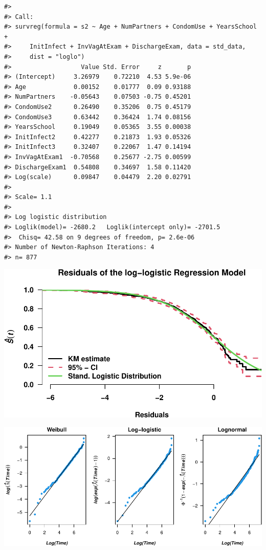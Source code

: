 \documentclass[
]{article}
\begin{document}
\begin{verbatim}
#> 
#> Call:
#> survreg(formula = s2 ~ Age + NumPartners + CondomUse + YearsSchool + 
#>     InitInfect + InvVagAtExam + DischargeExam, data = std_data, 
#>     dist = "loglo")
#>                   Value Std. Error     z       p
#> (Intercept)     3.26979    0.72210  4.53 5.9e-06
#> Age             0.00152    0.01777  0.09 0.93188
#> NumPartners    -0.05643    0.07503 -0.75 0.45201
#> CondomUse2      0.26490    0.35206  0.75 0.45179
#> CondomUse3      0.63442    0.36424  1.74 0.08156
#> YearsSchool     0.19049    0.05365  3.55 0.00038
#> InitInfect2     0.42277    0.21873  1.93 0.05326
#> InitInfect3     0.32407    0.22067  1.47 0.14194
#> InvVagAtExam1  -0.70568    0.25677 -2.75 0.00599
#> DischargeExam1  0.54808    0.34697  1.58 0.11420
#> Log(scale)      0.09847    0.04479  2.20 0.02791
#> 
#> Scale= 1.1 
#> 
#> Log logistic distribution
#> Loglik(model)= -2680.2   Loglik(intercept only)= -2701.5
#>  Chisq= 42.58 on 9 degrees of freedom, p= 2.6e-06 
#> Number of Newton-Raphson Iterations: 4 
#> n= 877
\end{verbatim}

\includegraphics{practical_files/figure-latex/fit-loglog-1.pdf}

\includegraphics{practical_files/figure-latex/cumhaz-plot-1.pdf}
\end{document}
